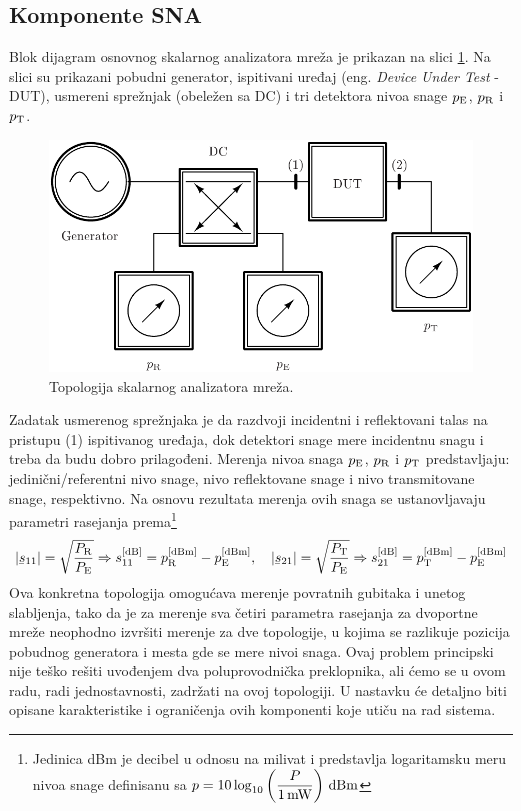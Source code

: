 \documentclass[a4paper, 12pt, diplomski]{etf}
\newcommand{\unit}[1]{\,{\rm #1}}
\newcommand{\faz}[1]{\underaccent{\bar}{#1}}
\begin{document}
\subsection{Komponente SNA}
Blok dijagram osnovnog skalarnog analizatora mreža je prikazan
na slici \ref{fig:sna_block}. Na slici su prikazani
pobudni generator, ispitivani uređaj 
(eng. \textit{Device Under Test} - DUT), 
usmereni sprežnjak (obeležen sa DC)
i tri detektora nivoa snage $p_{\rm E}$,
$p_{\rm R}$ i $p_{\rm T}$. 
%
\begin{figure}[b!]
    \centering
    \includegraphics{fig/sna_block_simple.pdf}
    \caption{Topologija skalarnog analizatora mreža.}
    \label{fig:sna_block}
\end{figure}
%
Zadatak 
usmerenog sprežnjaka je da razdvoji 
incidentni i reflektovani talas na 
pristupu (1) ispitivanog uređaja, dok 
detektori snage mere incidentnu snagu i
treba da budu dobro prilagođeni. Merenja 
nivoa
snaga $p_{\rm E}$, $p_{\rm R}$ i $p_{\rm T}$ predstavljaju:
 jedinični/referentni nivo snage, nivo
 reflektovane snage i nivo 
 transmitovane snage, respektivno. Na osnovu rezultata merenja ovih snaga se ustanovljavaju parametri rasejanja prema\footnote{
Jedinica dBm je decibel u odnosu na milivat i predstavlja
logaritamsku meru nivoa snage definisanu sa 
$p = 10 \log_{10} 
\left( \dfrac{P}{1\unit{mW}} \right) \unit{dBm}$
}
\begin{equation}
   |\faz s_{11}| = \sqrt{ \dfrac{P_{\rm R}}{P_{\rm E}} } \Rightarrow
    s_{11}^{[\rm dB]}
    = p_{\rm R}^{[\rm dBm]} - p_{\rm E}^{[\rm dBm]},
    \quad
    |\faz s_{21}| = \sqrt{ \dfrac{P_{\rm T}}{P_{\rm E}} } \Rightarrow
    s_{21}^{[\rm dB]}
    = p_{\rm T}^{[\rm dBm]} - p_{\rm E}^{[\rm dBm]}
    \label{eq:s11s212}
\end{equation}
%
Ova konkretna topologija omogućava merenje povratnih gubitaka i 
unetog slabljenja, tako da je za merenje sva četiri parametra
rasejanja za dvoportne mreže 
neophodno
izvršiti merenje za dve topologije, u kojima se 
razlikuje pozicija pobudnog generatora i mesta 
gde se mere nivoi snaga.
%
Ovaj problem principski nije teško rešiti uvođenjem dva
poluprovodnička preklopnika, ali ćemo se u ovom radu,
radi jednostavnosti, zadržati na 
ovoj topologiji.
U nastavku će detaljno biti opisane karakteristike i ograničenja
ovih komponenti koje utiču na rad sistema. 
\end{document}
